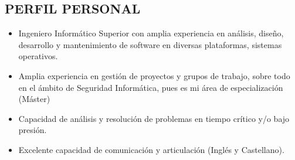 \documentclass[line,margin]{res}
\begin{document}

\begin{resume}
 
\section{PERFIL PERSONAL}       
                \begin{itemize}  \itemsep 2pt %
                \item  Ingeniero Inform\'{a}tico Superior con amplia 
                experiencia en an\'{a}lisis, dise\~{n}o, desarrollo y 
                mantenimiento de software en diversas plataformas, sistemas 
                operativos.
                \item Amplia experiencia en gesti\'{o}n de proyectos y grupos de 
                trabajo, sobre todo en el \'{a}mbito de Seguridad 
                Inform\'{a}tica, pues es mi \'{a}rea de especializaci\'{o}n 
                (M\'{a}ster)
                \item Capacidad de an\'{a}lisis y resoluci\'{o}n de problemas en 
                tiempo cr\'{i}tico y/o bajo presi\'{o}n.
                \item Excelente capacidad de comunicaci\'{o}n y articulaci\'{o}n 
                (Ingl\'{e}s y Castellano).
                \end{itemize}
         

\end{resume}
\end{document}
